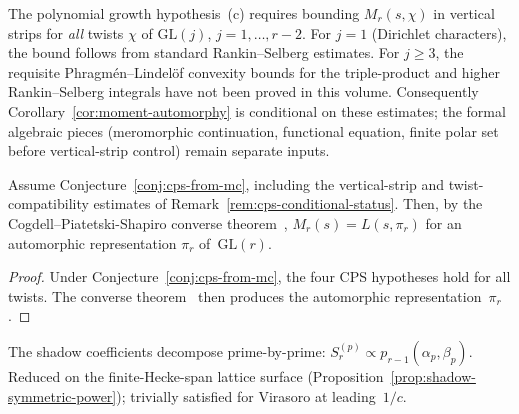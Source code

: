 \begin{remark}%
\label{rem:cps-conditional-status}%
%
The polynomial growth hypothesis~(c) requires
bounding $M_r(s, \chi)$ in vertical strips for \emph{all}
twists $\chi$ of $\mathrm{GL}(j)$, $j = 1, \ldots, r-2$.
For $j = 1$ (Dirichlet characters), the bound follows from
standard Rankin--Selberg estimates. For $j \geq 3$, the
requisite Phragm\'en--Lindel\"of convexity bounds for
the triple-product and higher Rankin--Selberg integrals have
not been proved in this volume. Consequently
Corollary~\ref{cor:moment-automorphy} is conditional on these
estimates; the formal algebraic pieces (meromorphic continuation,
functional equation, finite polar set before vertical-strip control)
remain separate inputs.
\end{remark}

\begin{corollary}%
\label{cor:moment-automorphy}%
\ClaimStatusConditional
{}%
Assume Conjecture~\ref{conj:cps-from-mc}, including the
vertical-strip and twist-compatibility estimates of
Remark~\ref{rem:cps-conditional-status}. Then, by the
Cogdell--Piatetski-Shapiro converse theorem~\cite{CPS1999},
$M_r(s) = L(s, \pi_r)$ for an automorphic representation
$\pi_r$ of~$\mathrm{GL}(r)$.
\end{corollary}

\begin{proof}
Under Conjecture~\ref{conj:cps-from-mc}, the four CPS hypotheses
hold for all twists. The converse theorem~\cite{CPS1999} then
produces the automorphic
representation~$\pi_r$.
\end{proof}

\begin{conjecture}%
\label{conj:prime-locality-transfer}%
\ClaimStatusConjectured%
%
The shadow coefficients decompose prime-by-prime:
$S_r^{(p)} \propto p_{r-1}(\alpha_p, \beta_p)$.
Reduced on the finite-Hecke-span lattice surface
\textup{(}Proposition~\textup{\ref{prop:shadow-symmetric-power}}\textup{)};
trivially satisfied for Virasoro at leading~$1/c$.
\end{conjecture}

